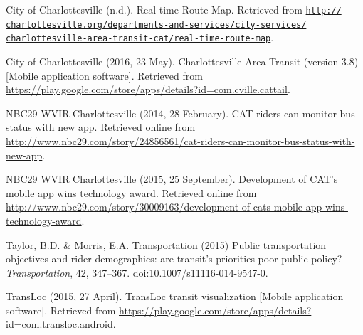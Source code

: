 \documentclass[12pt,letterpaper]{article}
\begin{document}
City of Charlottesville (n.d.). Real-time Route Map. Retrieved from \href{http://www.charlottesville.org/departments-and-services/city-services/charlottesville-area-transit-cat/real-time-route-map}{\tt http:// \\
charlottesville.org/departments-and-services/city-services/ \\
charlottesville-area-transit-cat/real-time-route-map}.

City of Charlottesville (2016, 23 May). Charlottesville Area Transit (version 3.8) [Mobile application software]. Retrieved from \url{https://play.google.com/store/apps/details?id=com.cville.cattail}.

NBC29 WVIR Charlottesville (2014, 28 February). CAT riders can monitor bus status with new app. Retrieved online from \url{http://www.nbc29.com/story/24856561/cat-riders-can-monitor-bus-status-with-new-app}.

NBC29 WVIR Charlottesville (2015, 25 September). Development of CAT's mobile app wins technology award. Retrieved online from \url{http://www.nbc29.com/story/30009163/development-of-cats-mobile-app-wins-technology-award}.

Taylor, B.D. \& Morris, E.A. Transportation (2015) Public transportation objectives and rider demographics:
are transit’s priorities poor public policy? \emph{Transportation}, 42, 347--367. doi:10.1007/s11116-014-9547-0.

TransLoc (2015, 27 April). TransLoc transit visualization [Mobile application software]. Retrieved from \url{https://play.google.com/store/apps/details?id=com.transloc.android}.
\end{document}
